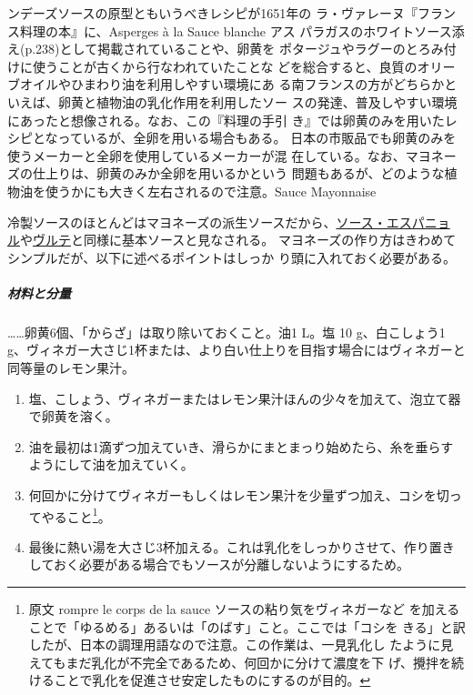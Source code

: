 \begin{recette}
{{{{{  ンデーズソース}の原型ともいうべきレシピが1651年の
  ラ・ヴァレーヌ『フランス料理の本』に、Asperges à la Sauce blanche アス
  パラガスのホワイトソース添え(p.238)として掲載されていることや、卵黄を
  ポタージュやラグーのとろみ付けに使うことが古くから行なわれていたことな
  どを総合すると、良質のオリーブオイルやひまわり油を利用しやすい環境にあ
  る南フランスの方がどちらかといえば、卵黄と植物油の乳化作用を利用したソー
  スの発達、普及しやすい環境にあったと想像される。なお、この『料理の手引
  き』では卵黄のみを用いたレシピとなっているが、全卵を用いる場合もある。
  日本の市販品でも卵黄のみを使うメーカーと全卵を使用しているメーカーが混
  在している。なお、マヨネーズの仕上りは、卵黄のみか全卵を用いるかという
  問題もあるが、どのような植物油を使うかにも大きく左右されるので注意。}}{Sauce Mayonnaise}}\label{mayonnaise}}


冷製ソースのほとんどはマヨネーズの派生ソースだから、\protect\hyperlink{sauce-espagnole}{ソース・エスパニョ
ル}や\protect\hyperlink{veloute}{ヴルテ}と同様に基本ソースと見なされる。
マヨネーズの作り方はきわめてシンプルだが、以下に述べるポイントはしっか
り頭に入れておく必要がある。

\hypertarget{ux6750ux6599ux3068ux5206ux91cf}{%
\subparagraph{材料と分量}\label{ux6750ux6599ux3068ux5206ux91cf}}

\ldots{}\ldots{}卵黄6個、「からざ」は取り除いておくこと。油1 L。塩 10
g、白こしょう1
g、ヴィネガー大さじ1\undemi{}杯または、より白い仕上りを目指す場合にはヴィネガーと同等量のレモン果汁。

\begin{enumerate}
\def\labelenumi{\arabic{enumi}.}
\item
  塩、こしょう、ヴィネガーまたはレモン果汁ほんの少々を加えて、泡立て器で卵黄を溶く。
\item
  油を最初は1滴ずつ加えていき、滑らかにまとまっり始めたら、糸を垂らすようにして油を加えていく。
\item
  何回かに分けてヴィネガーもしくはレモン果汁を少量ずつ加え、コシを切ってやること\footnote{原文
    rompre le corps de la sauce ソースの粘り気をヴィネガーなど
    を加えることで「ゆるめる」あるいは「のばす」こと。ここでは「コシを
    きる」と訳したが、日本の調理用語なので注意。この作業は、一見乳化し
    たように見えてもまだ乳化が不完全であるため、何回かに分けて濃度を下
    げ、攪拌を続けることで乳化を促進させ安定したものにするのが目的。}。
\item
  最後に熱い湯を大さじ3杯加える。これは乳化をしっかりさせて、作り置きしておく必要がある場合でもソースが分離しないようにするため。
\end{enumerate}


\end{recette}

